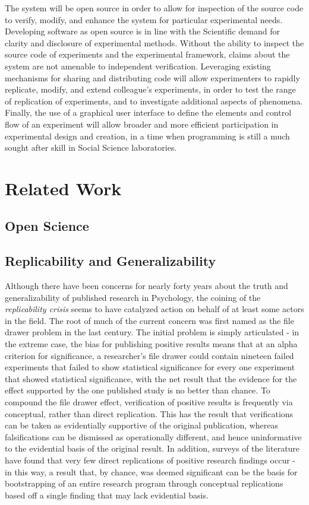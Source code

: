 \documentclass[12pt,a4paper,titlepage]{scrreprt}
\begin{document}
    The system will be open source in order to allow for inspection of the source code to verify, modify, and enhance the system for particular experimental needs. Developing software as open source is in line with the Scientific demand for clarity and disclosure of experimental methods. Without the ability to inspect the source code of experiments and the experimental framework, claims about the system are not amenable to independent verification.
    Leveraging existing mechanisms for sharing and distributing code will allow experimenters to rapidly replicate, modify, and extend colleague's experiments, in order to test the range of replication of experiments, and to investigate additional aspects of phenomena. Finally, the use of a graphical user interface to define the elements and control flow of an experiment will allow broader and more efficient participation in experimental design and creation, in a time when programming is still a much sought after skill in Social Science laboratories.

\newpage

\chapter{Related Work}
\section{Open Science}
\section{Replicability and Generalizability}
Although there have been concerns for nearly forty years\cite{greenwald_consequences_1975} about the truth and generalizability of published research in Psychology, the coining of the \textit{replicability crisis}\cite{pashler_editors_2012} seems to have catalyzed action on behalf of at least some actors in the field. The root of much of the current concern was first named as the file drawer problem in the last century\cite{rosenthal_file_1979}. The initial problem is simply articulated - in the extreme case, the bias for publishing positive results means that at an alpha criterion for significance, a researcher's file drawer could contain nineteen failed experiments that failed to show statistical significance for every one experiment that showed statistical significance, with the net result that the evidence for the effect supported by the one published study is no better than chance. To compound the file drawer effect, verification of positive results is frequently via conceptual, rather than direct replication\cite{pashler_is_2012}. This has the result that verifications can be taken as evidentially supportive of the original publication, whereas falsifications can be dismissed as operationally different, and hence uninformative to the evidential basis of the original result. In addition, surveys of the literature have found that very few direct replications of positive research findings occur\cite{makel_replications_2012} - in this way, a result that, by chance, was deemed significant can be the basis for bootstrapping of an entire research program through conceptual replications based off a single finding that may lack evidential basis.
\end{document}
